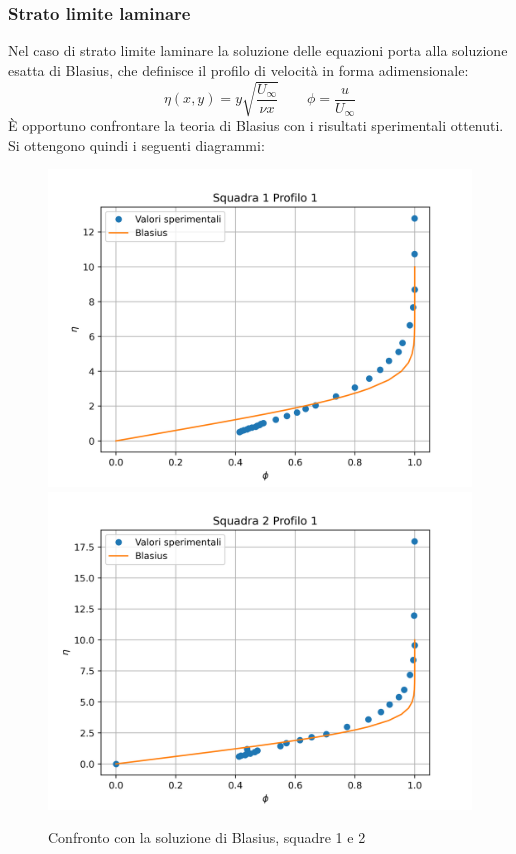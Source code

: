 \subsubsection{Strato limite laminare}
Nel caso di strato limite laminare la soluzione delle equazioni porta alla soluzione esatta di Blasius, che definisce il profilo di velocità in forma adimensionale:
\begin{equation*}
    \eta(x,y) = y\sqrt{\frac{U_\infty}{\nu x}} \qquad \phi = \frac{u}{U_\infty}
\end{equation*}
È opportuno confrontare la teoria di Blasius con i risultati sperimentali ottenuti. Si ottengono quindi i seguenti diagrammi:
\begin{figure}[H]
    \centering
    \includegraphics[width=.49\textwidth]{images/9/sq1p1_blasius.png}
    \includegraphics[width=.49\textwidth]{images/9/sq2p1_blasius.png}
    \caption{Confronto con la soluzione di Blasius, squadre 1 e 2}
\end{figure}

